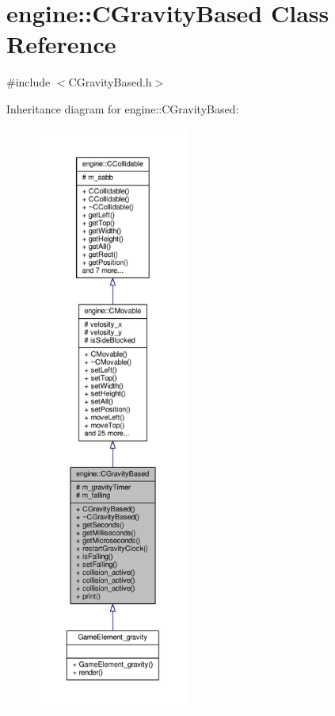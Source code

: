 \hypertarget{classengine_1_1CGravityBased}{\section{engine\-:\-:C\-Gravity\-Based Class Reference}
\label{classengine_1_1CGravityBased}
}


{\ttfamily \#include $<$C\-Gravity\-Based.\-h$>$}



Inheritance diagram for engine\-:\-:C\-Gravity\-Based\-:\nopagebreak
\begin{figure}[H]
\begin{center}
\leavevmode
\includegraphics[height=550pt]{classengine_1_1CGravityBased__inherit__graph}
\end{center}
\end{figure}



